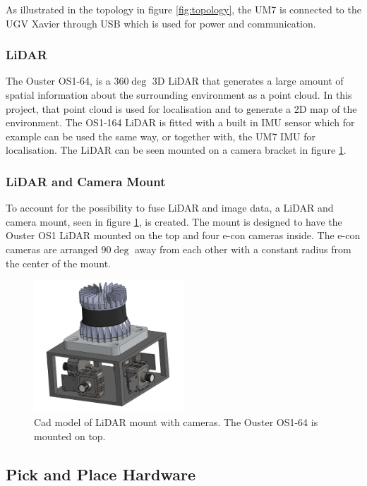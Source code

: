 As illustrated in the topology in figure \ref{fig:topology}, the UM7 is connected to the UGV Xavier through USB which is used for power and communication.

\subsubsection{LiDAR}\label{sec:M:H:ANH:Lidar}
The Ouster OS1-64, is a $360\deg$ 3D LiDAR that generates a large amount of spatial information about the surrounding environment as a point cloud. In this project, that point cloud is used for localisation and to generate a 2D map of the environment. The OS1-164 LiDAR is fitted with a built in IMU sensor which for example can be used the same way, or together with, the UM7 IMU for localisation. The LiDAR can be seen mounted on a camera bracket in figure \ref{fig:lidar_mount}.

\subsubsection{LiDAR and Camera Mount}\label{sec:M:H:ANH:LidarAndCameraMount}
To account for the possibility to fuse LiDAR and image data, a LiDAR and camera mount, seen in figure \ref{fig:lidar_mount}, is created. The mount is designed to have the Ouster OS1 LiDAR mounted on the top and four e-con cameras inside. The e-con cameras are arranged $90\deg$ away from each other with a constant radius from the center of the mount.

\begin{figure}[H]
  \centering
  \includegraphics[width = 0.5\textwidth]{Figures/lidar_mount.png}
  \caption{Cad model of LiDAR mount with cameras. The Ouster OS1-64 is mounted on top.}
  \label{fig:lidar_mount}
\end{figure}

\subsection{Pick and Place Hardware}\label{sec:M:H:PickandPlaceHardware}

